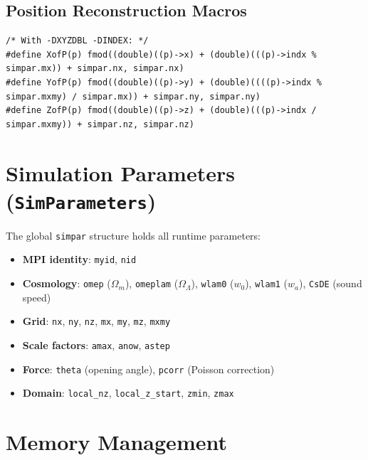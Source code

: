 \documentclass[11pt,fleqn]{book}
\newcommand{\code}[1]{\texttt{#1}}
\begin{document}
\subsection{Position Reconstruction Macros}

\begin{lstlisting}[style=ccode,numbers=none]
/* With -DXYZDBL -DINDEX: */
#define XofP(p) fmod((double)((p)->x) + (double)(((p)->indx % simpar.mx)) + simpar.nx, simpar.nx)
#define YofP(p) fmod((double)((p)->y) + (double)((((p)->indx % simpar.mxmy) / simpar.mx)) + simpar.ny, simpar.ny)
#define ZofP(p) fmod((double)((p)->z) + (double)(((p)->indx / simpar.mxmy)) + simpar.nz, simpar.nz)
\end{lstlisting}

\section{Simulation Parameters (\code{SimParameters})}

\begin{definition}
The global \code{simpar} structure holds all runtime parameters:
\begin{itemize}[leftmargin=2em]
  \item \textbf{MPI identity}: \code{myid}, \code{nid}
  \item \textbf{Cosmology}: \code{omep} ($\Omega_m$), \code{omeplam} ($\Omega_\Lambda$), \code{wlam0} ($w_0$), \code{wlam1} ($w_a$), \code{CsDE} (sound speed)
  \item \textbf{Grid}: \code{nx}, \code{ny}, \code{nz}, \code{mx}, \code{my}, \code{mz}, \code{mxmy}
  \item \textbf{Scale factors}: \code{amax}, \code{anow}, \code{astep}
  \item \textbf{Force}: \code{theta} (opening angle), \code{pcorr} (Poisson correction)
  \item \textbf{Domain}: \code{local\_nz}, \code{local\_z\_start}, \code{zmin}, \code{zmax}
\end{itemize}
\end{definition}

\section{Memory Management}
\end{document}
